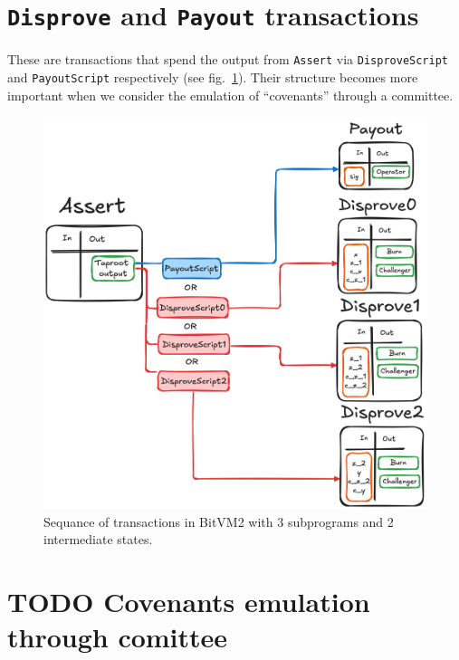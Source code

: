 \documentclass[11pt]{article}
\begin{document}
\section{\texttt{Disprove} and \texttt{Payout}
transactions}\label{sec:disprove-payout-txs}

These are transactions that spend the output from \texttt{Assert} via
\texttt{DisproveScript} and \texttt{PayoutScript} respectively (see
fig.~\ref{fig:bitvm-txs}). Their structure becomes more important when
we consider the emulation of ``covenants'' through a committee.

\begin{figure}[htbp]
  \centering
  \includegraphics[width=.9\linewidth]{../images/bitvm-txs.png}
  \caption{\label{fig:bitvm-txs}Sequance of transactions in BitVM2
  with 3 subprograms and 2 intermediate states.}
\end{figure}

\section{{\bfseries\sffamily TODO} Covenants emulation through
comittee}\label{sec:covenants-emulation}

\printbibliography{}
\end{document}
